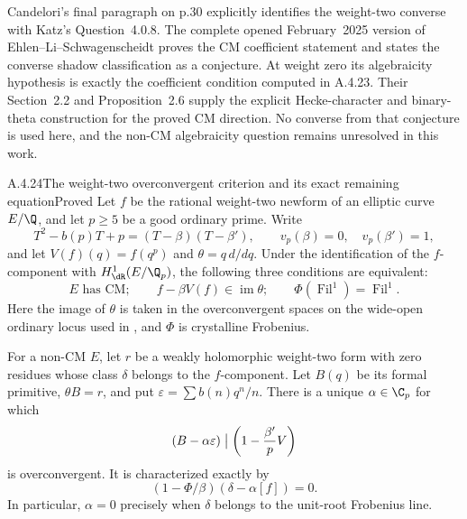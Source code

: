 Candelori's final paragraph on p.30 explicitly identifies the weight-two converse with Katz's Question~4.0.8. The complete opened February~2025 version of Ehlen--Li--Schwagenscheidt \cite[Corollary 1.2 and Conjecture 1.5, pp.3--4]{EllEhlenLiSchwagenscheidt2024} proves the CM coefficient statement and states the converse shadow classification as a conjecture. At weight zero its algebraicity hypothesis is exactly the coefficient condition computed in A.4.23. Their Section~2.2 and Proposition~2.6 supply the explicit Hecke-character and binary-theta construction for the proved CM direction. No converse from that conjecture is used here, and the non-CM algebraicity question remains unresolved in this work.

\begin{result}{A.4.24}{The weight-two overconvergent criterion and its exact remaining equation}{Proved}
Let $f$ be the rational weight-two newform of an elliptic curve $E/\Q$, and let $p\ge5$ be a good ordinary prime. Write
\[
 T^2-b(p)T+p=(T-\beta)(T-\beta'),\qquad
 v_p(\beta)=0,\quad v_p(\beta')=1,
\]
and let $V(f)(q)=f(q^p)$ and $\theta=q\,d/dq$. Under the identification of the $f$-component with $H^1_{\dR}(E/\Q_p)$, the following three conditions are equivalent:
\[
 E\text{ has CM};\qquad
 f-\beta V(f)\in\operatorname{im}\theta;\qquad
 \Phi(\operatorname{Fil}^1)=\operatorname{Fil}^1.
\]
Here the image of $\theta$ is taken in the overconvergent spaces on the wide-open ordinary locus used in \cite[Theorem 3.3]{EllCandeloriCastella2017}, and $\Phi$ is crystalline Frobenius.

For a non-CM $E$, let $r$ be a weakly holomorphic weight-two form with zero residues whose class $\delta$ belongs to the $f$-component. Let $B(q)$ be its formal primitive, $\theta B=r$, and put $\varepsilon=\sum b(n)q^n/n$. There is a unique $\alpha\in\C_p$ for which
\[
 (B-\alpha\varepsilon)\bigm|\left(1-\frac{\beta'}pV\right)
\]
is overconvergent. It is characterized exactly by
\[
 (1-\Phi/\beta)(\delta-\alpha[f])=0.
\]
In particular, $\alpha=0$ precisely when $\delta$ belongs to the unit-root Frobenius line.
\end{result}
